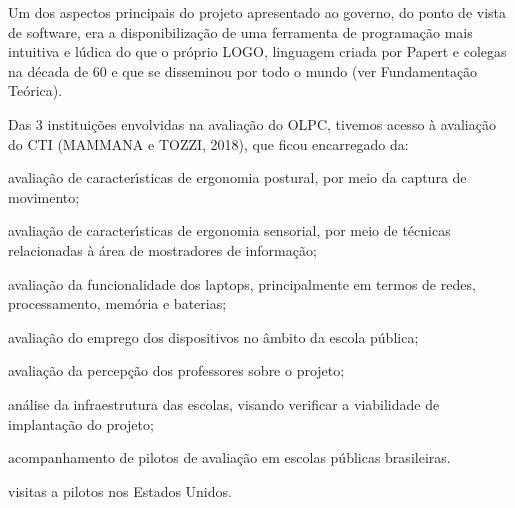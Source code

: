 \documentclass[
12pt,		%
openright,	%
twoside,  %
a4paper,			%
chapter=TITLE,		%
english,			%
french,				%
spanish,			%
brazil				%
]{USPSC-classe/USPSC}
\begin{document}
Um dos aspectos principais do projeto apresentado ao governo, do ponto de vista de software, era a disponibiliza\c{c}\~ao de uma ferramenta de programa\c{c}\~ao mais intuitiva e l\'udica do que o pr\'oprio LOGO, linguagem criada por Papert e colegas na d\'ecada de 60 e que se disseminou por todo o mundo (ver Fundamenta\c{c}\~ao Te\'orica).

















Das 3 institui\c{c}\~oes envolvidas na avalia\c{c}\~ao do OLPC, tivemos acesso \`a avalia\c{c}\~ao do CTI  (MAMMANA e TOZZI, 2018), que ficou encarregado da:


















\begin{alineas}
\item avalia\c{c}\~ao de caracter\'{\i}sticas de ergonomia postural, por meio da captura de movimento;
\item avalia\c{c}\~ao de caracter\'{\i}sticas de ergonomia sensorial, por meio de t\'ecnicas relacionadas \`a \'area de mostradores de informa\c{c}\~ao;
\item avalia\c{c}\~ao da funcionalidade dos \textquotedbl laptops\textquotedbl , principalmente em termos de redes, processamento, mem\'oria e baterias;
\item avalia\c{c}\~ao do emprego dos dispositivos no \^ambito da escola p\'ublica;
\item avalia\c{c}\~ao da percep\c{c}\~ao dos professores sobre o projeto;
\item an\'alise da infraestrutura das escolas, visando verificar a viabilidade de implanta\c{c}\~ao do projeto;
\item acompanhamento de pilotos de avalia\c{c}\~ao em escolas p\'ublicas brasileiras.
\item visitas a pilotos nos Estados Unidos.
\end{alineas}
\end{document}
